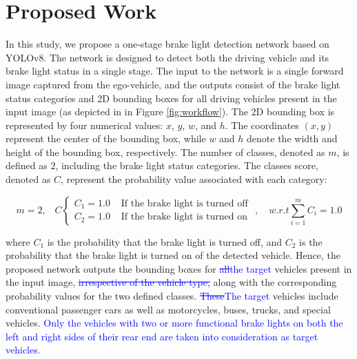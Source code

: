 \section{Proposed Work}
\label{sec:proposed}

In this study, we propose a one-stage brake light detection network based on YOLOv8. The network is designed to detect both the driving vehicle and its brake light status in a single stage. 
The input to the network is a single forward image captured from the ego-vehicle, and the outputs consist of the brake light status categories and 2D bounding boxes for all driving vehicles present in the input image (as depicted in in Figure \ref{fig:workflow}).
The 2D bounding box is represented by four numerical values: $x$, $y$, $w$, and $h$. The coordinates $(x,y)$ represent the center of the bounding box, while $w$ and $h$ denote the width and height of the bounding box, respectively. 
The number of classes, denoted as $m$, is defined as $2$, including the brake light status categories.
The classes score, denoted as $C$, represent the probability value associated with each category:

\begin{equation}
    m=2, \;\;\; C   \begin{cases}
        C_{1}=1.0 & \text{ If the brake light is turned off } \\
        C_{2}=1.0 & \text{ If the brake light is turned on }
        \end{cases}
        , \quad w.r.t \sum_{i=1}^{m}{C_{i}}=1.0
\end{equation}

where $C_{1}$ is the probability that the brake light is turned off, and $C_{2}$ is the probability that the brake light is turned on of the detected vehicle.
Hence, the proposed network outputs the bounding boxes for \textcolor{blue}{ \sout{all}the target} vehicles present in the input image, \textcolor{blue}{ \sout{irrespective of the vehicle type, }}along with the corresponding probability values for the two defined classes.
\textcolor{blue}{ \sout{These}The target} vehicles include conventional passenger cars as well as motorcycles, buses, trucks, and special vehicles.
\textcolor{blue}{Only the vehicles with two or more functional brake lights on both the left and right sides of their rear end are taken into consideration as target vehicles.}

